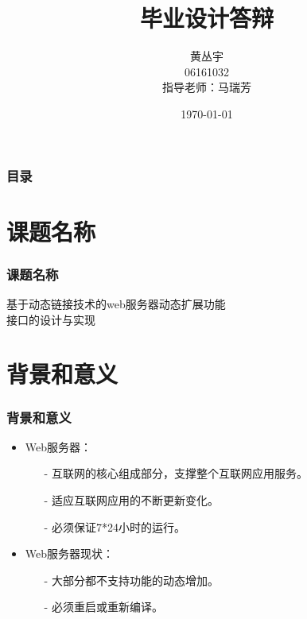 \documentclass[12pt,dvipdfm]{beamer}
\begin{document}
\title[毕业设计答辩]{\LARGE{毕业设计答辩\\}}
\author[黄丛宇]{黄丛宇\\06161032\\指导老师：马瑞芳}
\date{\today}

\begin{frame}	
	\titlepage
\end{frame}

\begin{frame}
	\frametitle{目录}
	\tableofcontents
\end{frame}

\section{课题名称}
\begin{frame}
	\frametitle{课题名称}
	
	\begin{center}
	{\Large
			基于动态链接技术的web服务器动态扩展功能\\
				接口的设计与实现
	}
	\end{center}
\end{frame}

\section{背景和意义}
\begin{frame}
	\frametitle{背景和意义}
	\begin{itemize}
		\item Web服务器：
			\begin{itemize}
				\item[-] 互联网的核心组成部分，支撑整个互联网应用服务。
				\item[-] 适应互联网应用的不断更新变化。
				\item[-] 必须保证7*24小时的运行。
			\end{itemize}
		\pause
		\item {\cp Web}服务器现状：
			\begin{itemize}
				\item[-] 大部分都不支持功能的动态增加。
				\item[-] 必须重启或重新编译。
			\end{itemize}
	\end{itemize}
\end{frame}
\end{document}
